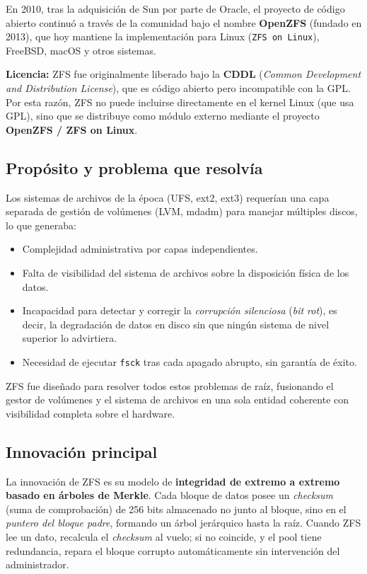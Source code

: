 \documentclass[12pt,letterpaper]{article}
\begin{document}
En 2010, tras la adquisición de Sun por parte de Oracle, el proyecto de código abierto continuó a través de la
comunidad bajo el nombre \textbf{OpenZFS} (fundado en 2013), que hoy mantiene la implementación para Linux
(\texttt{ZFS on Linux}), FreeBSD, macOS y otros sistemas.

\begin{mdframed}[backgroundcolor=azulclaro, linecolor=azuloscuro, linewidth=1pt, roundcorner=4pt]
  \textbf{Licencia:} ZFS fue originalmente liberado bajo la \textbf{CDDL}
  (\emph{Common Development and Distribution License}), que es código abierto pero incompatible con la GPL. Por
  esta razón, ZFS no puede incluirse directamente en el kernel Linux (que usa GPL), sino que se distribuye como
  módulo externo mediante el proyecto \textbf{OpenZFS / ZFS on Linux}.
\end{mdframed}

\subsection{Propósito y problema que resolvía}
Los sistemas de archivos de la época (UFS, ext2, ext3) requerían una capa separada de gestión de volúmenes
(LVM, mdadm) para manejar múltiples discos, lo que generaba:

\begin{itemize}
\item Complejidad administrativa por capas independientes.
\item Falta de visibilidad del sistema de archivos sobre la disposición física de los datos.
\item Incapacidad para detectar y corregir la \emph{corrupción silenciosa} (\emph{bit rot}), es decir, la
  degradación de datos en disco sin que ningún sistema de nivel superior lo advirtiera.
\item Necesidad de ejecutar \texttt{fsck} tras cada apagado abrupto, sin garantía de éxito.
\end{itemize}

ZFS fue diseñado para resolver todos estos problemas de raíz, fusionando el gestor de volúmenes y el sistema de
archivos en una sola entidad coherente con visibilidad completa sobre el hardware.

\subsection{Innovación principal}
La innovación de ZFS es su modelo de \textbf{integridad de extremo a extremo basado en árboles de Merkle}.
Cada bloque de datos posee un \emph{checksum} (suma de comprobación) de 256 bits almacenado no junto al bloque,
sino en el \emph{puntero del bloque padre}, formando un árbol jerárquico hasta la raíz. Cuando ZFS lee un dato,
recalcula el \emph{checksum} al vuelo; si no coincide, y el pool tiene redundancia, repara el bloque corrupto
automáticamente sin intervención del administrador.
\end{document}
